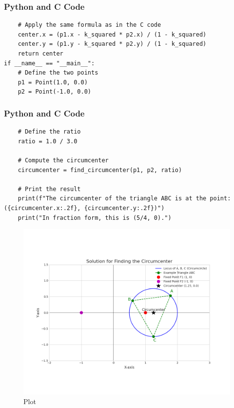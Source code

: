 \documentclass{beamer}
\begin{document}
\begin{frame}[fragile]
\frametitle{Python and C Code}
\begin{lstlisting}
    # Apply the same formula as in the C code
    center.x = (p1.x - k_squared * p2.x) / (1 - k_squared)
    center.y = (p1.y - k_squared * p2.y) / (1 - k_squared)
    return center
if __name__ == "__main__":
    # Define the two points
    p1 = Point(1.0, 0.0)
    p2 = Point(-1.0, 0.0)
\end{lstlisting}
\end{frame}

\begin{frame}[fragile]
\frametitle{Python and C Code}
\begin{lstlisting}
    # Define the ratio
    ratio = 1.0 / 3.0

    # Compute the circumcenter
    circumcenter = find_circumcenter(p1, p2, ratio)

    # Print the result
    print(f"The circumcenter of the triangle ABC is at the point: ({circumcenter.x:.2f}, {circumcenter.y:.2f})")
    print("In fraction form, this is (5/4, 0).")

\end{lstlisting}
\end{frame}
\begin{frame}
\begin{figure}
    \centering
    \includegraphics[width=0.75\columnwidth]{graph9.png}
    \caption{Plot}
    \label{fig:placeholder}
\end{figure}
\end{frame}
\end{document}
